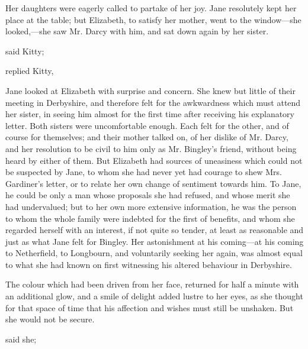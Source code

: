 Her daughters were eagerly called to partake of her joy. Jane resolutely kept her place at the table; but Elizabeth, to satisfy her mother, went to the window---she looked,---she saw Mr. Darcy with him, and sat down again by her sister.

 said Kitty; 


 replied Kitty, 


Jane looked at Elizabeth with surprise and concern. She knew but little of their meeting in Derbyshire, and therefore felt for the awkwardness which must attend her sister, in seeing him almost for the first time after receiving his explanatory letter. Both sisters were uncomfortable enough. Each felt for the other, and of course for themselves; and their mother talked on, of her dislike of Mr. Darcy, and her resolution to be civil to him only as Mr. Bingley's friend, without being heard by either of them. But Elizabeth had sources of uneasiness which could not be suspected by Jane, to whom she had never yet had courage to shew Mrs. Gardiner's letter, or to relate her own change of sentiment towards him. To Jane, he could be only a man whose proposals she had refused, and whose merit she had undervalued; but to her own more extensive information, he was the person to whom the whole family were indebted for the first of benefits, and whom she regarded herself with an interest, if not quite so tender, at least as reasonable and just as what Jane felt for Bingley. Her astonishment at his coming---at his coming to Netherfield, to Longbourn, and voluntarily seeking her again, was almost equal to what she had known on first witnessing his altered behaviour in Derbyshire.

The colour which had been driven from her face, returned for half a minute with an additional glow, and a smile of delight added lustre to her eyes, as she thought for that space of time that his affection and wishes must still be unshaken. But she would not be secure.

 said she; 


